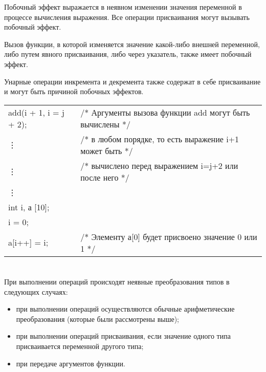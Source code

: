Побочный эффект выражается в неявном изменении значения переменной в процессе вычисления выражения. Все операции присваивания могут вызывать побочный эффект. 

Вызов функции, в которой изменяется значение какой-либо внешней переменной, либо путем явного присваивания, либо через указатель, также имеет побочный эффект.

Унарные операции инкремента и декремента также содержат в себе присваивание и могут быть причиной побочных эффектов. \killoverfullbefore \BL

\begin{pExample}
\begin{tabular}{ l l }
add(i + 1, i = j + 2); & \textcolor{exComm}{/* Аргументы вызова функции add могут быть вычислены */} \\
\vdots & \textcolor{exComm}{/* в любом порядке, то есть выражение i+1 может быть */} \\
\vdots & \textcolor{exComm}{/* вычислено перед выражением i=j+2 или после него */} \\
\vdots & \textcolor{exComm}{ } \\
int i, а [10]; & \textcolor{exComm}{ } \\
i = 0;  & \textcolor{exComm}{ } \\
a[i++] = i; & \textcolor{exComm}{/* Элементу а[0] будет присвоено значение 0 или 1 */ } \\
\end{tabular}
\end{pExample}

\section{}

При выполнении операций происходят неявные преобразования типов в следующих случаях: 
\begin{itemize}
\item при выполнении операций осуществляются обычные арифметические преобразования (которые были рассмотрены выше);  
\item при выполнении операций присваивания, если значение одного типа присваивается переменной другого типа;
\item при передаче аргументов функции. \killoverfullbefore \BL  
\end{itemize}


